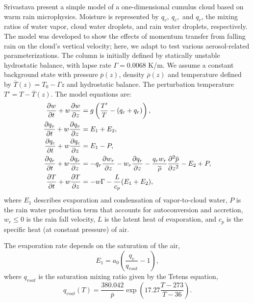 Srivastava \cite{Srivastava1967} present a simple model of a one-dimensional cumulus cloud based on warm rain microphysics.
Moisture is represented by $q_v,~q_c,$ and $q_r$, the mixing ratios of water vapor, cloud water droplets, and rain water droplets, respectively.
The model was developed to show the effects of momentum transfer from falling rain on the cloud's vertical velocity; here, we adapt to test various aerosol-related parameterizations.
The column is initially defined by statically unstable hydrostatic balance, with lapse rate $\Gamma = 0.0068$ K/m.
We assume a constant background state with pressure $\overline{p}(z)$, density $\overline{\rho}(z)$ and temperature defined by $\overline{T}(z) = T_0 - \Gamma z$ and hydrostatic balance.
The perturbation temperature $T' = T - \overline{T}(z)$.
The model equations are:
\begin{subequations}
  \begin{align}
    \frac{\partial w }{\partial t} + w\frac{\partial w }{\partial z} & = g\left( \frac{T'}{T} - (q_c + q_r)\right),\\
    \frac{\partial q_v }{\partial t} + w\frac{\partial q_v }{\partial z} &= E_1 + E_2, \\
    \frac{\partial q_c }{\partial t} + w\frac{\partial q_c }{\partial z} &= E_1 - P, \\
    \frac{\partial q_r }{\partial t} + w\frac{\partial q_r }{\partial z} &= - q_r\frac{\partial w_r }{\partial z} - w_r\frac{\partial q_r }{\partial z} - \frac{q_r w_r}{\overline{\rho}}\frac{\partial^2 \overline{p}}{\partial z ^2}  - E_2 + P,\\
    \frac{\partial T }{\partial t} + w\frac{\partial T }{\partial z} &= -w\Gamma - \frac{L}{c_p}(E_1+E_2),
  \end{align}
\end{subequations}
where $E_1$ describes evaporation and condensation of vapor-to-cloud water, $P$ is the rain water production term that accounts for autoconversion and accretion, $w_r \le 0$ is the rain fall velocity, $L$ is the latent heat of evaporation, and $c_p$ is the specific heat (at constant pressure) of air.

The evaporation rate depends on the saturation of the air,
\begin{equation}
  E_1 = a_0\left(\frac{q_v}{q_{vsat}} - 1\right),
\end{equation}
where $q_{vsat}$ is the saturation mixing ratio given by the Tetens equation,
\begin{equation}
  q_{vsat}(T) = \frac{380.042}{\overline{p}}\exp\left(17.27 \frac{T-273}{T-36}\right).
\end{equation}

